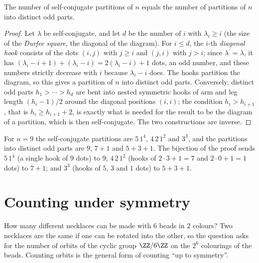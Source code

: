 \begin{proposition}\label{combinatorics:proposition-self-conjugate}
The number of self-conjugate partitions of $n$ equals the number of partitions of $n$ into distinct odd parts.
\end{proposition}

\begin{proof}
Let $\lambda$ be self-conjugate, and let $d$ be the number of $i$ with $\lambda_i \geq i$ (the size of the \emph{Durfee square}, the diagonal of the diagram). For $i \leq d$, the $i$-th \emph{diagonal
hook} consists of the dots $(i, j)$ with $j \geq i$ and $(j, i)$ with $j > i$; since $\lambda^{\prime} = \lambda$, it has $(\lambda_i - i + 1) + (\lambda_i - i) = 2(\lambda_i - i) + 1$ dots, an odd number,
and these numbers strictly decrease with $i$ because $\lambda_i - i$ does. The hooks partition the diagram, so this gives a partition of $n$ into distinct odd parts. Conversely, distinct odd parts
$h_1 > \cdots > h_d$ are bent into nested symmetric hooks of arm and leg length $(h_i - 1)/2$ around the diagonal positions $(i, i)$; the condition $h_i > h_{i+1}$, that is
$h_i \geq h_{i+1} + 2$, is exactly what is needed for the result to be the diagram of a partition, which is then self-conjugate. The two constructions are inverse.
\end{proof}

\begin{example}\label{combinatorics:example-self-conjugate}
For $n = 9$ the self-conjugate partitions are $5\,1^4$, $4\,2\,1^2$ and $3^3$, and the partitions into distinct odd parts are $9$, $7 + 1$ and $5 + 3 + 1$. The bijection of the proof sends
$5\,1^4$ (a single hook of $9$ dots) to $9$; $4\,2\,1^2$ (hooks of $2 \cdot 3 + 1 = 7$ and $2 \cdot 0 + 1 = 1$ dots) to $7 + 1$; and $3^3$ (hooks of $5$, $3$ and $1$ dots) to $5 + 3 + 1$.
\end{example}

\section{Counting under symmetry}\label{combinatorics:section-symmetry}

How many different necklaces can be made with $6$ beads in $2$ colours? Two necklaces are the same if one can be rotated into the other, so the question asks for the number of orbits of the cyclic group
$\ZZ/6\ZZ$ on the $2^6$ colourings of the beads. Counting orbits is the general form of counting ``up to symmetry''.


